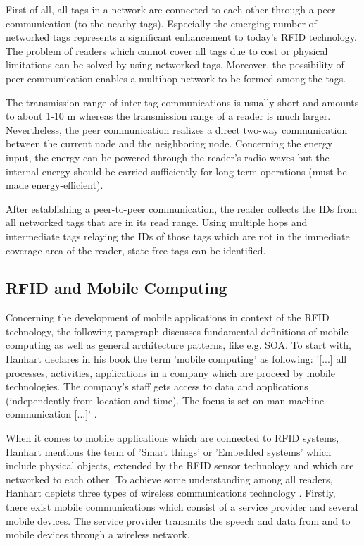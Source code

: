 First of all, all tags in a network are connected to each other through a peer communication (to the nearby tags). Especially the emerging number of networked tags represents a significant enhancement to today's RFID technology. The problem of readers which cannot cover all tags due to cost or physical limitations can be solved by using networked tags. Moreover, the possibility of peer communication enables a multihop network to be formed among the tags. 

The transmission range of inter-tag communications is usually short and amounts to about 1-10 m whereas the transmission range of a reader is much larger. 
Nevertheless, the peer communication realizes a direct two-way communication between the current node and the neighboring node. Concerning the energy input, the energy can be powered through the reader's radio waves but the internal energy should be carried sufficiently for long-term operations (must be made energy-efficient).

After establishing a peer-to-peer communication, the reader collects the IDs from all networked tags that are in its read range. Using multiple hops and intermediate tags relaying the IDs of those tags which are not in the immediate coverage area of the reader, state-free tags can be identified. 

\subsection{RFID and Mobile Computing}

Concerning the development of mobile applications in context of the RFID technology, the following paragraph discusses fundamental definitions of mobile computing as well as general architecture patterns, like e.g. \ac{SOA}. 
To start with, Hanhart declares in his book \cite[p.9 ff.]{mobile} the term 'mobile computing' as following: '[...] all processes, activities, applications in a company which are proceed by mobile technologies. The company's staff gets access to data and applications (independently from location and time). The focus is set on man-machine-communication [...]' \cite[p.9 ff.]{mobile}. 

When it comes to mobile applications which are connected to RFID systems, Hanhart mentions the term of 'Smart things' or 'Embedded systems' which include physical objects, extended by the RFID sensor technology and which are networked to each other. To achieve some understanding among all readers, Hanhart depicts three types of wireless communications technology \cite[p.12-13]{mobile}. Firstly, there exist mobile communications which consist of a service provider and several mobile devices. The service provider transmits the speech and data from and to mobile devices through a wireless network. 

